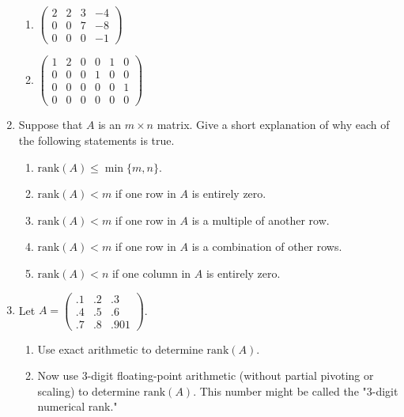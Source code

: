 \begin{enumerate}[leftmargin=*, label=\bfseries 2.1.\arabic*]
\begin{enumerate}[label=(\alph*)]
    \item $\begin{pmatrix}
        2 & 2 & 3 & -4 \\
        0 & 0 & 7 & -8 \\
        0 & 0 & 0 & -1
    \end{pmatrix}$
    
    \item $\begin{pmatrix}
        1 & 2 & 0 & 0 & 1 & 0 \\
        0 & 0 & 0 & 1 & 0 & 0 \\
        0 & 0 & 0 & 0 & 0 & 1 \\
        0 & 0 & 0 & 0 & 0 & 0
    \end{pmatrix}$
\end{enumerate}

\item Suppose that \( A \) is an \( m \times n \) matrix. Give a short explanation of why each of the following statements is true.

\begin{enumerate}[label=(\alph*)]
    \item \(\text{rank}(A) \leq \min\{m, n\}\).
    
    \item \(\text{rank}(A) < m\) if one row in \( A \) is entirely zero.
    
    \item \(\text{rank}(A) < m\) if one row in \( A \) is a multiple of another row.
    
    \item \(\text{rank}(A) < m\) if one row in \( A \) is a combination of other rows.
    
    \item \(\text{rank}(A) < n\) if one column in \( A \) is entirely zero.
\end{enumerate}

\item Let \( A = \begin{pmatrix}
    .1 & .2 & .3 \\
    .4 & .5 & .6 \\
    .7 & .8 & .901
\end{pmatrix} \).

\begin{enumerate}[label=(\alph*)]
    \item Use exact arithmetic to determine \(\text{rank}(A)\).
    
    \item Now use 3-digit floating-point arithmetic (without partial pivoting or scaling) to determine \(\text{rank}(A)\). This number might be called the "3-digit numerical rank."
    

\end{enumerate}
\end{enumerate}
